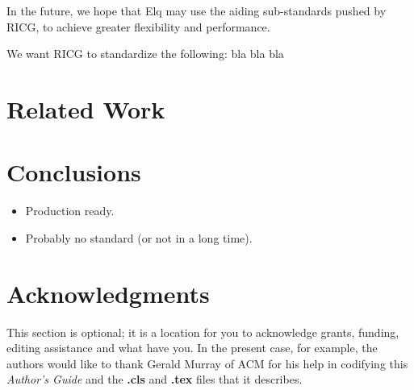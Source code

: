 \documentclass{acm_proc_article-sp}
\begin{document}
    In the future, we hope that Elq may use the aiding sub-standards pushed by RICG, to achieve greater flexibility and performance.

    We want RICG to standardize the following: bla bla bla

\section{Related Work}
  

\section{Conclusions}
  \begin{itemize}
    \item Production ready.
    \item Probably no standard (or not in a long time).
  \end{itemize}


\section{Acknowledgments}
This section is optional; it is a location for you
to acknowledge grants, funding, editing assistance and
what have you.  In the present case, for example, the
authors would like to thank Gerald Murray of ACM for
his help in codifying this \textit{Author's Guide}
and the \textbf{.cls} and \textbf{.tex} files that it describes.

%

%
%
\end{document}
